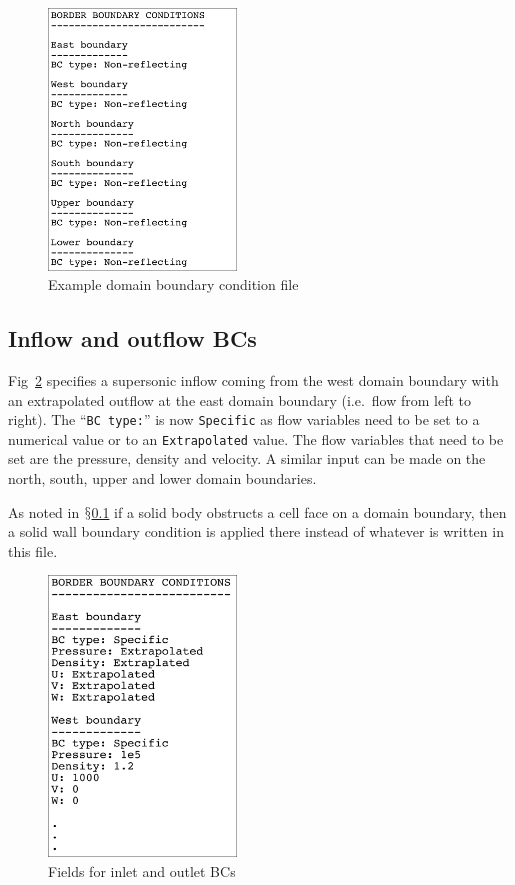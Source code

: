 \documentclass[pdftex, 12pt, a4paper]{report}
\begin{document}
\begin{figure}[htp]
\centering
\includegraphics[width=5cm]{pics/ov_BC_template.jpg}
\caption{Example domain boundary condition file}
\label{fig:ov_BC.par}
\end{figure}

\subsection{Inflow and outflow BCs}\label{sec:BC_fixed}

Fig~\ref{fig:ov_BC2.par} specifies a supersonic inflow coming from the west domain boundary with an extrapolated outflow
at the east domain boundary (i.e.\ flow from left to right).  The ``\verb'BC type:''' is now \verb'Specific' as flow variables need to be 
set to a numerical value or to an \verb'Extrapolated' value.  The flow variables that need to be set are the pressure, density 
and velocity.  A similar input can be made on the north, south, upper and lower domain boundaries.   

As noted in $\mathsection$\ref{sec:BC_fixed} if a solid body obstructs a cell face on a domain boundary, then a solid wall boundary 
condition is applied there instead of whatever is written in this file.

\begin{figure}[htp]
\centering
\includegraphics[width=5cm]{pics/ov_BC_template2.jpg}
\caption{Fields for inlet and outlet BCs}
\label{fig:ov_BC2.par}
\end{figure}
\end{document}
